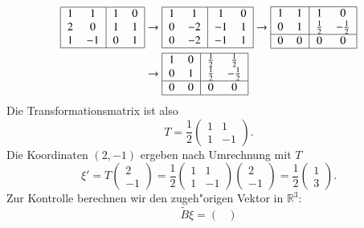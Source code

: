 \begin{beispiel}
\begin{align*}
\begin{tabular}{|>{$}c<{$}>{$}c<{$}|>{$}c<{$}>{$}c<{$}|}
\hline
1& 1&1&0\\
2& 0&1&1\\
1&-1&0&1\\
\hline
\end{tabular}
&\rightarrow
\begin{tabular}{|>{$}c<{$}>{$}c<{$}|>{$}c<{$}>{$}c<{$}|}
\hline
1& 1& 1&0\\
0&-2&-1&1\\
0&-2&-1&1\\
\hline
\end{tabular}
\rightarrow
\begin{tabular}{|>{$}c<{$}>{$}c<{$}|>{$}c<{$}>{$}c<{$}|}
\hline
1& 1&      1&       0\\
0& 1&\frac12&-\frac12\\
\hline
0& 0&      0&       0\\
\hline
\end{tabular}
\\
&\rightarrow
\begin{tabular}{|>{$}c<{$}>{$}c<{$}|>{$}c<{$}>{$}c<{$}|}
\hline
1& 0& \frac12& \frac12\\
0& 1& \frac12&-\frac12\\
\hline
0& 0&      0&       0\\
\hline
\end{tabular}
\end{align*}
Die Transformationsmatrix ist also 
\[
T=
\frac12\begin{pmatrix} 1&1\\1&-1 \end{pmatrix}.
\]
Die Koordinaten $(2,-1)$ ergeben nach Umrechnung mit $T$ 
\[
\xi'=
T\begin{pmatrix}2\\-1\end{pmatrix}
=
\frac12\begin{pmatrix} 1&1\\1&-1 \end{pmatrix}
\begin{pmatrix}2\\-1\end{pmatrix}
=\frac12\begin{pmatrix}1\\3\end{pmatrix}.
\]
Zur Kontrolle berechnen wir den zugeh"origen Vektor in $\mathbb R^3$:
\[
\tilde B\xi=
\begin{pmatrix}

\end{pmatrix}\]
\end{beispiel}
